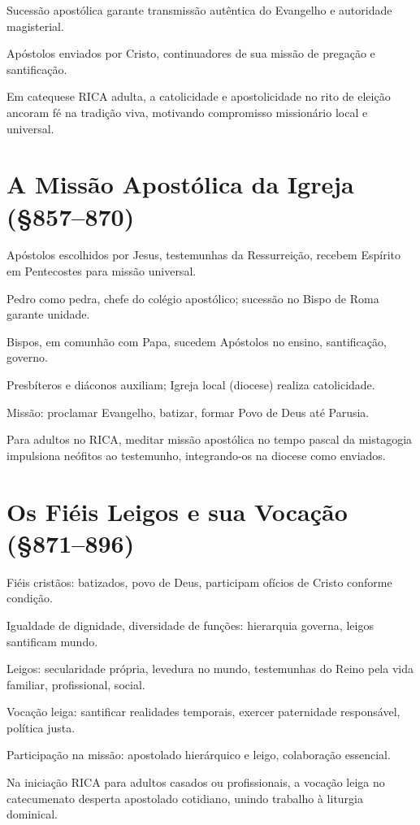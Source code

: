 Sucessão apostólica garante transmissão autêntica do Evangelho e autoridade magisterial.

Apóstolos enviados por Cristo, continuadores de sua missão de pregação e santificação.

Em catequese RICA adulta, a catolicidade e apostolicidade no rito de eleição ancoram fé na tradição viva, motivando compromisso missionário local e universal.

\section{A Missão Apostólica da Igreja (\S 857--870)}

Apóstolos escolhidos por Jesus, testemunhas da Ressurreição, recebem Espírito em Pentecostes para missão universal.

Pedro como pedra, chefe do colégio apostólico; sucessão no Bispo de Roma garante unidade.

Bispos, em comunhão com Papa, sucedem Apóstolos no ensino, santificação, governo.

Presbíteros e diáconos auxiliam; Igreja local (diocese) realiza catolicidade.

Missão: proclamar Evangelho, batizar, formar Povo de Deus até Parusia.

Para adultos no RICA, meditar missão apostólica no tempo pascal da mistagogia impulsiona neófitos ao testemunho, integrando-os na diocese como enviados.

\section{Os Fiéis Leigos e sua Vocação (\S 871--896)}

Fiéis cristãos: batizados, povo de Deus, participam ofícios de Cristo conforme condição.

Igualdade de dignidade, diversidade de funções: hierarquia governa, leigos santificam mundo.

Leigos: secularidade própria, levedura no mundo, testemunhas do Reino pela vida familiar, profissional, social.

Vocação leiga: santificar realidades temporais, exercer paternidade responsável, política justa.

Participação na missão: apostolado hierárquico e leigo, colaboração essencial.

Na iniciação RICA para adultos casados ou profissionais, a vocação leiga no catecumenato desperta apostolado cotidiano, unindo trabalho à liturgia dominical.

